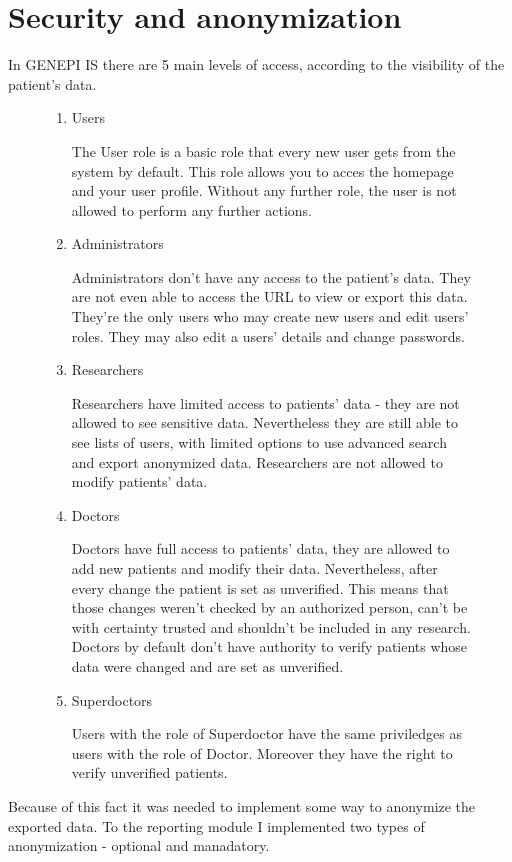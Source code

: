 \documentclass[thesis=B,english]{FITthesis}[2012/10/20]
\begin{document}
\section{Security and anonymization}
In GENEPI IS there are 5 main levels of access, according to the visibility of the patient's data.
\begin{figure}[ht]
	\begin{enumerate}
	\item{Users}
	
	The User role is a basic role that every new user gets from the system by default. This role allows you to acces the homepage 	and your user profile. Without any further role, the user is not allowed to perform any further actions.

	\item{Administrators}

	Administrators don't have any access to the patient's data. They are not even able to access the URL to view or export this data. They're the only users who may create new users and edit users' roles. They may also edit a users' details and change passwords.
	\item{Researchers}

	Researchers have limited access to patients' data - they are not allowed to see sensitive data. Nevertheless they are still able to see lists of users, with limited options to use advanced search and export anonymized data. Researchers are not allowed to modify patients' data.
	\item{Doctors}

	Doctors have full access to patients' data, they are allowed to add new patients and modify their data. Nevertheless, after every change the patient is set as unverified. This means that those changes weren't checked by an authorized person, can't be with certainty trusted and shouldn't be included in any research. Doctors by default don't have authority to verify patients whose data were changed and are set as unverified.

	\item{Superdoctors}

	Users with the role of Superdoctor have the same priviledges as users with the role of Doctor. Moreover they have the right to verify unverified patients.

	\end{enumerate}
\end{figure}

Because of this fact it was needed to implement some way to anonymize the exported data. To the reporting module I implemented two types of anonymization - optional and manadatory.
\end{document}
